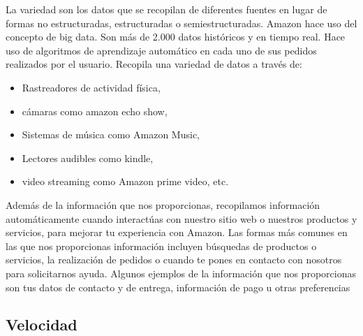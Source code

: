 La variedad son los datos que se recopilan de diferentes fuentes en lugar de formas no estructuradas, estructuradas o semiestructuradas. Amazon hace uso del concepto de big data. Son más de 2.000 datos históricos y en tiempo real. Hace uso de algoritmos de aprendizaje automático en cada uno de sus pedidos realizados por el usuario. Recopila una variedad de datos a través de:

\begin{itemize}
	\item Rastreadores de actividad física,
	\item cámaras como amazon echo show,
	\item Sistemas de música como Amazon Music,
	\item Lectores audibles como kindle,
	\item video streaming como Amazon prime video, etc.
\end{itemize}

Además de la información que nos proporcionas, recopilamos información automáticamente cuando interactúas con nuestro sitio web o nuestros productos y servicios, para mejorar tu experiencia con Amazon.
Las formas más comunes en las que nos proporcionas información incluyen búsquedas de productos o servicios, la realización de pedidos o cuando te pones en contacto con nosotros para solicitarnos ayuda. Algunos ejemplos de la información que nos proporcionas son tus datos de contacto y de entrega, información de pago u otras preferencias 


\clearpage
\subsection{Velocidad}

